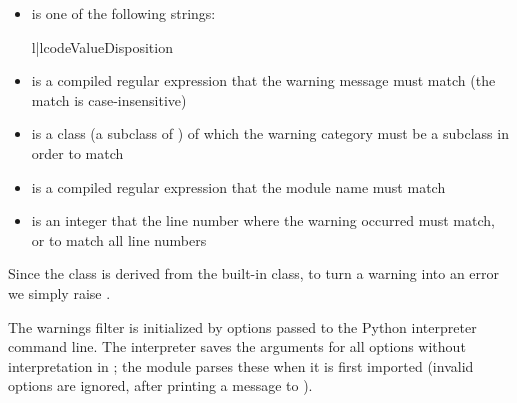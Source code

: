 \begin{itemize}

\item {} is one of the following strings:

    \begin{tableii}{l|l}{code}{Value}{Disposition}







    \end{tableii}

\item {} is a compiled regular expression that the warning
message must match (the match is case-insensitive)

\item {} is a class (a subclass of ) of
      which the warning category must be a subclass in order to match

\item {} is a compiled regular expression that the module
      name must match

\item {} is an integer that the line number where the
      warning occurred must match, or  to match all line
      numbers

\end{itemize}

Since the  class is derived from the built-in
 class, to turn a warning into an error we simply
raise .

The warnings filter is initialized by  options passed
to the Python interpreter command line.  The interpreter saves the
arguments for all  options without interpretation in
; the  module parses these when
it is first imported (invalid options are ignored, after printing a
message to ).


